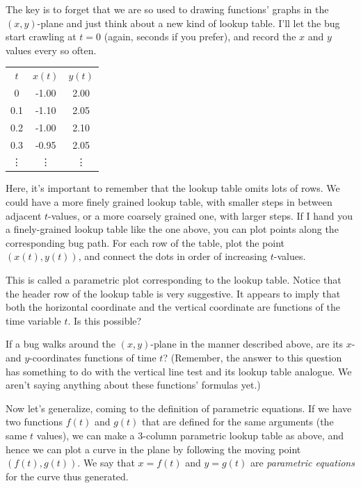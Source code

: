 \documentclass[11pt]{amsart}
\begin{document}
The key is to forget that we are so used to drawing functions' graphs in the $(x,y)$-plane and just think about a new kind of lookup table. I'll let the bug start crawling at $t = 0$ (again, seconds if you prefer), and record the $x$ and $y$ values every so often.

\begin{table}[h]
\centering
\begin{tabular}{|c|c|c|}
$t$ & $x(t)$ & $y(t)$ \\
0   & -1.00  & 2.00   \\
0.1 & -1.10  & 2.05   \\
0.2 & -1.00  & 2.10   \\
0.3 & -0.95  & 2.05   \\
\vdots & \vdots & \vdots
\end{tabular}
\end{table}


Here, it's important to remember that the lookup table omits lots of rows. We could have a more finely grained lookup table, with smaller steps in between adjacent $t$-values, or a more coarsely grained one, with larger steps. If I hand you a finely-grained lookup table like the one above, you can plot points along the corresponding bug path. For each row of the table, plot the point $(x(t),y(t))$, and connect the dots in order of increasing $t$-values.

This is called a parametric plot corresponding to the lookup table. Notice that the header row of the lookup table is very suggestive. It appears to imply that both the horizontal coordinate and the vertical coordinate are functions of the time variable $t$. Is this possible?
\begin{discussionquestion}
	If a bug walks around the $(x,y)$-plane in the manner described above, are its $x$- and $y$-coordinates functions of time $t$? (Remember, the answer to this question has something to do with the vertical line test and its lookup table analogue. We aren't saying anything about these functions' formulas yet.)
\end{discussionquestion}

Now let's generalize, coming to the definition of parametric equations. If we have two functions $f(t)$ and $g(t)$ that are defined for the same arguments (the same $t$ values), we can make a 3-column parametric lookup table as above, and hence we can plot a curve in the plane by following the moving point $(f(t), g(t))$. We say that $x = f(t)$ and $y = g(t)$ are \emph{parametric equations} for the curve thus generated.
\end{document}
